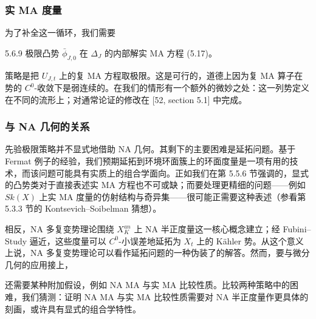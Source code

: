
\subsubsection{实 MA 度量}
为了补全这一循环，我们需要

\begin{lemma}{5.6.9}
极限凸势 $\bar\phi_{J,0}$ 在 $\Delta_J$ 的内部解实 MA 方程 (5.17)。
\end{lemma}

策略是把 $U_{J,t}$ 上的复 MA 方程取极限。这是可行的，道德上因为复 MA 算子在势的 $C^0$-收敛下是弱连续的。在我们的情形有一个额外的微妙之处：这一列势定义在不同的流形上；对通常论证的修改在 [52, section 5.1] 中完成。


\subsubsection{与 NA 几何的关系}
先验极限策略并不显式地借助 NA 几何。其剩下的主要困难是延拓问题。基于 Fermat 例子的经验，我们预期延拓到环境环面簇上的环面度量是一项有用的技术，而该问题可能具有实质上的组合学面向。正如我们在第 5.5.6 节强调的，显式的凸势类对于直接表述实 MA 方程也不可或缺；而要处理更精细的问题------例如 $Sk(X)$ 上实 MA 度量的仿射结构与奇异集------很可能正需要这种表述（参看第 5.3.3 节的 Kontsevich--Soibelman 猜想）。

相反，NA 多复变势理论围绕 $X_K^{an}$ 上 NA 半正度量这一核心概念建立；经 Fubini--Study 逼近，这些度量可以 $C^0$-小误差地延拓为 $X_t$ 上的 Kähler 势。从这个意义上说，NA 多复变势理论可以看作延拓问题的一种伪装了的解答。然而，要与微分几何的应用接上，

还需要某种附加假设，例如 NA MA 与实 MA 比较性质。比较两种策略中的困难，我们猜测：证明 NA MA 与实 MA 比较性质需要对 NA 半正度量作更具体的刻画，或许具有显式的组合学特性。

